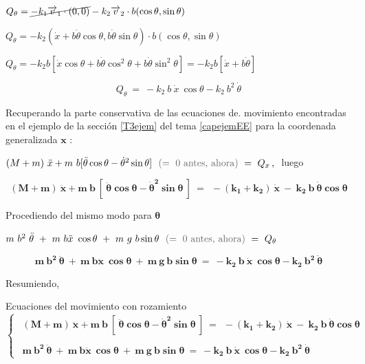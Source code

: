 $Q_\theta= \cancel{ -k_1 \overrightarrow v_1 \cdot (0,0)} - k_2 \overrightarrow v_2 \cdot b(\cos \theta, \sin \theta)$

$Q_\theta=-k_2(\dot x + b \dot \theta \cos \theta, b \dot \theta \sin \theta) \cdot b (\cos \theta, \sin \theta)$

$Q_\theta=-k_2b[\dot x \cos \theta + b \dot \theta \cos^2 \theta+b \dot \theta \sin^2 \theta]=-k_2 b [\dot x + b \dot \theta]$

\begin{equation}
Q_\theta \ = \ -k_2\ b \ \dot x \ \cos \theta - k_2 \ b^2 \ \dot \theta	
\end{equation}

Recuperando la parte conservativa de las ecuaciones de. movimiento encontradas en el ejemplo de la sección \ref{T3ejem} del tema \ref{capejemEE} para la coordenada generalizada $\boldsymbol x$ :

$(M+m)\ \ddot x + m\ b [\ddot \theta \cos \theta -\dot \theta^2 \sin \theta]\ \textcolor{gris}{ \ (= \ 0 \text{ antes, ahora}  ) \ } = \ Q_x\, , \  $ luego 

\begin{equation}
\boldsymbol{
	(M+m)\ \ddot x + m\ b \ [\ \ddot \theta \cos \theta -\dot \theta^2 \sin \theta \ ] \ = \ \ -(k_1+k_2) \ \dot x \ - \  k_2 \ b \ \dot \theta \cos \theta	
}
\end{equation}

Procediendo del mismo modo para $\boldsymbol \theta$

$m\ b^2 \ \ddot \theta \ + \ m \ b \ddot x \ \cos \theta \ + \ m\ g \ b \sin \theta \ \textcolor{gris}{ \ (= \ 0 \text{ antes, ahora}  ) \ } =\ Q_\theta$ 

\begin{equation}
\boldsymbol{
m\ b^2 \ \ddot \theta \ + \ m \ b \ddot x \ \cos \theta \ + \ m\ g \ b \sin \theta \ = \ -k_2\ b \ \dot x \ \cos \theta - k_2 \ b^2 \ \dot \theta	
}
\end{equation}

Resumiendo,

\begin{myalertblock}{Ecuaciones del movimiento con rozamiento}
\begin{equation}
\begin{cases}
\ \ \boldsymbol{
	(M+m)\ \ddot x + m\ b \ [\ \ddot \theta \cos \theta -\dot \theta^2 \sin \theta \ ] \ = \ \ -(k_1+k_2) \ \dot x \ - \  k_2 \ b \ \dot \theta \cos \theta	
}
\\ \\ 	
\ \ \boldsymbol{
m\ b^2 \ \ddot \theta \ + \ m \ b \ddot x \ \cos \theta \ + \ m\ g \ b \sin \theta \ = \ -k_2\ b \ \dot x \ \cos \theta - k_2 \ b^2 \ \dot \theta	
}
\end{cases}
\end{equation}
\end{myalertblock}


